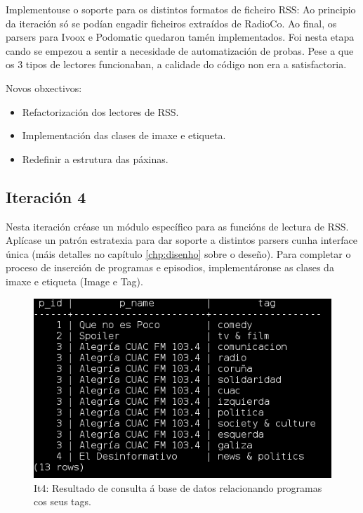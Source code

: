Implementouse o soporte para os distintos formatos de ficheiro RSS: Ao principio da iteración só se podían engadir ficheiros extraídos de RadioCo. Ao final, os parsers para Ivoox e Podomatic quedaron tamén implementados. Foi nesta etapa cando se empezou a sentir a necesidade de automatización de probas. Pese a que os 3 tipos de lectores funcionaban, a calidade do código non era a satisfactoria.

Novos obxectivos:

\begin{itemize}
	\item Refactorización dos lectores de RSS.
	\item Implementación das clases de imaxe e etiqueta.
	\item Redefinir a estrutura das páxinas. 
\end{itemize}


\subsection{Iteración 4}

Nesta iteración créase un módulo específico para as funcións de lectura de RSS. Aplícase un patrón estratexia para dar soporte a distintos parsers cunha interface única (máis detalles no capítulo \ref{chp:disenho} sobre o deseño). Para completar o proceso de inserción de programas e episodios, implementáronse as clases da imaxe e etiqueta (Image e Tag).

\begin{figure}[h]
	\centering
	\includegraphics[scale=0.6,keepaspectratio=true]{./images/tags.png}
	\caption{It4: Resultado de consulta á base de datos relacionando programas cos seus tags.}
	\label{fig:it4_tag}
\end{figure}

